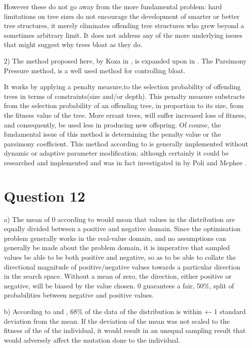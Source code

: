 \documentclass[12pt]{article}
\begin{document}
		However these do not go away from the more fundamental problem: hard limitations on tree sizes do not encourage the development of smarter or better tree structures, it merely eliminates offending tree structures who grew beyond a sometimes arbitrary limit. It does not address any of the more underlying issues that might suggest why trees bloat as they do.

		2) The method proposed here, by Koza in \cite{koza_1998}, is expanded upon in \cite{poli_langdon_mcphee_koza_2008}. The Parsimony Pressure method, is a well used method for controlling bloat.

		It works by applying a penalty measure,to the selection probability of offending trees in terms of constraints(size and/or depth). This penalty measure substracts from the selection probability of an offending tree, in proportion to its size, from the fitness value of the tree. More errant trees, will suffer increased loss of fitness, and consequently, be used less in producing new offspring.
Of course, the fundamental issue of this method is determining the penalty value or the parsimony coefficient. This method according to \cite{poli_langdon_mcphee_koza_2008} is generally implemented without dynamic or adaptive parameter modification; although certainly it could be researched and implemented and was in fact investigated in by Poli and Mcphee \cite{poli_mcphee_2013}.
\section{Question 12}
a) The mean of 0 according to \cite{normal_distribution} would mean that values in the distribution are equally divided between a positive and negative domain. Since the optimisation problem generally works in the real-value domain, and no assumptions can generally be made about the problem domain, it is imperative that sampled values be able to be both positive and negative, so as to be able to collate the directional magnitude of positive/negative values towards a particular direction in the search space. Without a mean of zero, the direction, either positive or negative, will be biased by the value chosen. 0 guarantees a fair, 50\%, split of probabilities between negative and positive values.

	b) According to \cite{normal_distribution} and \cite{areas_under_normal_distribution}, 68\% of the data of the distribution is within +- 1 standard deviation from the mean. If the deviation of the mean was not scaled to the fitness of the of the individual, it would result in an unequal sampling result that would adversely affect the mutation done to the individual.
\end{document}
